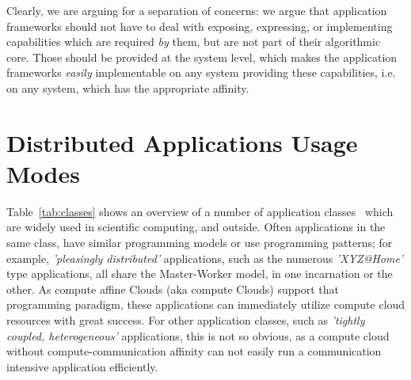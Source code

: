 \documentclass{article}
\newcommand{\I}[1]{\textit{#1}}
\begin{document}
  Clearly, we are arguing for a separation of concerns: we argue that
  application frameworks should not have to deal with exposing,
  expressing, or implementing capabilities which are required \I{by}
  them, but are not part of their algorithmic core.  Those should be
  provided at the system level, which makes the application frameworks
  \I{easily} implementable on any system providing these capabilities,
  i.e. on any system, which has the appropriate affinity.

\section{Distributed Applications Usage Modes}
\label{sec:apps}

 Table~\ref{tab:classes} shows an overview of a number of application
 classes~\cite{dpa_paper} which are widely used in scientific
 computing, and outside.  Often applications in the same class, have
 similar programming models or use programming patterns; for example,
 \I{'pleasingly distributed'} applications, such as the numerous
 \I{'XYZ@Home'} type applications, all share the Master-Worker model,
 in one incarnation or the other.  As compute affine Clouds (aka
 compute Clouds) support that programming paradigm, these applications
 can immediately utilize compute cloud resources with great success.
 For other application classes, such as \I{'tightly coupled,
 heterogeneous'} applications, this is not so obvious, as a compute
 cloud without compute-communication affinity can not easily run a
 communication intensive application efficiently.
 
\end{document}
